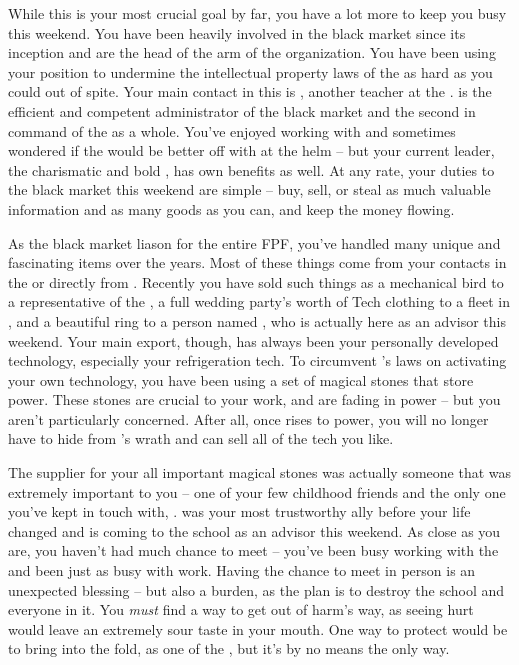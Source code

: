 \documentclass[char]{GL2020}
\begin{document}
While this is your most crucial goal by far, you have a lot more to keep you busy this weekend. You have been heavily involved in the black market since its inception and are the head of the \pTech{} arm of the organization. You have been using your position to undermine the intellectual property laws of the \pTech{} as hard as you could out of spite. Your main contact in this is \cChupSecond{}, another teacher at the \pSc{}. \cChupSecond{} is the efficient and competent administrator of the black market and the second in command of the \pGoaties{} as a whole. You’ve enjoyed working with \cChupSecond{} and sometimes wondered if the \pGoaties{} would be better off with \cChupSecond{} at the helm -- but your current leader, the charismatic and bold \cChupLeader{}, has \cChupLeader{\their} own benefits as well. At any rate, your duties to the black market this weekend are simple -- buy, sell, or steal as much valuable information and as many goods as you can, and keep the money flowing.

As the black market liason for the entire FPF, you've handled many unique and fascinating items over the years. Most of these things come from your contacts in the \pTech{} or directly from \cChupSecond{}. Recently you have sold such things as a mechanical bird to a representative of the \cQueen{}, a full wedding party’s worth of Tech clothing to a fleet in \pShip{}, and a beautiful ring to a person named \cHedonist{}, who is actually here as an advisor this weekend. Your main export, though, has always been your personally developed technology, especially your refrigeration tech. To circumvent \cTechGod{}’s laws on activating your own technology, you have been using a set of magical stones that store power. These stones are crucial to your work, and are fading in power -- but you aren’t particularly concerned. After all, once \cGenesis{} rises to power, you will no longer have to hide from \cTechGod{}’s wrath and can sell all of the tech you like.

The supplier for your all important magical stones was actually someone that was extremely important to you -- one of your few childhood friends and the only one you’ve kept in touch with, \cHeadScientist{}. \cHeadScientist{} was your most trustworthy ally before your life changed and is coming to the school as an advisor this weekend. As close as you are, you haven’t had much chance to meet -- you’ve been busy working with the \pGoaties{} and \cHeadScientist{\they} \cHeadScientist{\have} been just as busy with \cHeadScientist{\their} work. Having the chance to meet in person is an unexpected blessing -- but also a burden, as the plan is to destroy the school and everyone in it. You \emph{must} find a way to get \cHeadScientist{} out of harm’s way, as seeing \cHeadScientist{\them} hurt would leave an extremely sour taste in your mouth. One way to protect \cHeadScientist{\them} would be to bring \cHeadScientist{\them} into the fold, as one of the \pGoaties{}, but it’s by no means the only way.
\end{document}
